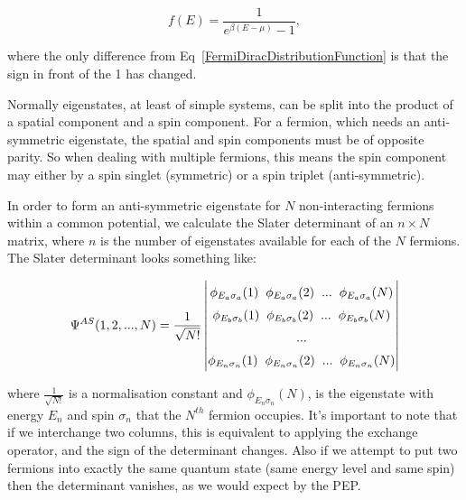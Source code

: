 \begin{equation}
    \boxed{f(E) = \frac{1}{e^{\beta (E - \mu)} - 1}},
    \label{BoseEinsteinDistributionFunction}
\end{equation}

\noindent where the only difference from Eq~\ref{FermiDiracDistributionFunction} is that the sign in front of the 1 has changed.

\noindent Normally eigenstates, at least of simple systems, can be split into the product of a spatial component and a spin component. For a fermion, which needs an anti-symmetric eigenstate, the spatial and spin components must be of opposite parity. So when dealing with multiple fermions, this means the spin component may either by a spin singlet (symmetric) or a spin triplet (anti-symmetric).

\noindent In order to form an anti-symmetric eigenstate for $N$ non-interacting fermions within a common potential, we calculate the Slater determinant of an $n \times N$ matrix, where $n$ is the number of eigenstates available for each of the $N$ fermions. The Slater determinant looks something like:

\begin{equation}
    \renewcommand*{\arraystretch}{1.5}
    \setlength\arraycolsep{20pt}
    \Psi^{AS} (1, 2, ..., N) = \frac{1}{\sqrt{N!}} \begin{vmatrix} \phi_{E_a\sigma_a} (1) \hspace{2mm} \phi_{E_a\sigma_a} (2) \hspace{2mm} ... \hspace{2mm} \phi_{E_a\sigma_a} (N) \\ \phi_{E_b\sigma_b} (1) \hspace{2mm} \phi_{E_b\sigma_b} (2) \hspace{2mm} ... \hspace{2mm} \phi_{E_b\sigma_b} (N) \\ ... \\ \phi_{E_n\sigma_n} (1) \hspace{2mm} \phi_{E_n\sigma_n} (2) \hspace{2mm} ... \hspace{2mm} \phi_{E_n\sigma_n} (N)      \end{vmatrix}
    \label{SlaterDeterminant}
\end{equation}

\noindent where $\frac{1}{\sqrt{N!}}$ is a normalisation constant and $\phi_{E_n\sigma_n} (N)$, is the eigenstate with energy $E_n$ and spin $\sigma_n$ that the $N^{th}$ fermion occupies. It's important to note that if we interchange two columns, this is equivalent to applying the exchange operator, and the sign of the determinant changes. Also if we attempt to put two fermions into exactly the same quantum state (same energy level and same spin) then the determinant vanishes, as we would expect by the PEP.

